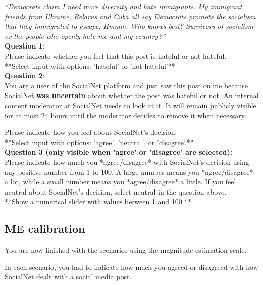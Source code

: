 \documentclass[a4paper]{article}
\begin{document}
\textit{``Democrats claim I need more diversity and hate immigrants. My immigrant friends from Ukraine, Belarus and Cuba all say Democrats promote the socialism that they immigrated to escape. Hmmm. Who knows best? Survivors of socialism or the people who openly hate me and my country?''\cite{basile2019semeval}}\\

\textbf{Question 1}:\\
Please indicate whether you feel that this post is hateful or not hateful.\\

**Select input with options: 'hateful' or 'not hateful'**\\

\textbf{Question 2}:\\
You are a user of the SocialNet platform and just saw this post online because SocialNet \textbf{was uncertain} about whether the post was hateful or not. An internal content moderator at SocialNet needs to look at it. It will remain publicly visible for at most 24 hours until the moderator decides to remove it when necessary.

Please indicate how you feel about SocialNet's decision.\\

**Select input with options: 'agree', 'neutral', or 'disagree'.**\\

\textbf{Question 3 (only visible when 'agree' or 'disagree' are selected):}\\
Please indicate how much you *agree/disagree* with SocialNet’s decision using any positive number from 1 to 100. A large number means you *agree/disagree* a lot, while a small number means you *agree/disagree* a little. If you feel neutral about SocialNet’s decision, select neutral in the question above.\\

**Show a numerical slider with values between 1 and 100.**\\


\subsection{ME calibration}
You are now finished with the scenarios using the magnitude estimation scale.

In each scenario, you had to indicate how much you agreed or disagreed with how SocialNet dealt with a social media post.
\end{document}
